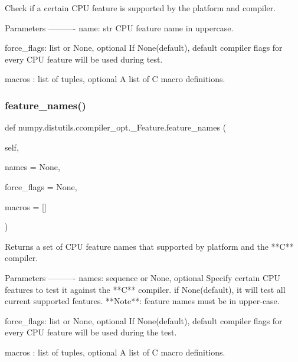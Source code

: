 \begin{DoxyVerb}Check if a certain CPU feature is supported by the platform and compiler.

Parameters
----------
name: str
    CPU feature name in uppercase.

force_flags: list or None, optional
    If None(default), default compiler flags for every CPU feature will
    be used during test.

macros : list of tuples, optional
    A list of C macro definitions.
\end{DoxyVerb}
 \mbox{\label{classnumpy_1_1distutils_1_1ccompiler__opt_1_1__Feature_afd8af969d9b3cc3872efe625903a55bd}} 
\subsubsection{\texorpdfstring{feature\+\_\+names()}{feature\_names()}}
{\footnotesize\ttfamily def numpy.\+distutils.\+ccompiler\+\_\+opt.\+\_\+\+Feature.\+feature\+\_\+names (\begin{DoxyParamCaption}\item[{}]{self,  }\item[{}]{names = {\ttfamily None},  }\item[{}]{force\+\_\+flags = {\ttfamily None},  }\item[{}]{macros = {\ttfamily \mbox{[}\mbox{]}} }\end{DoxyParamCaption})}

\begin{DoxyVerb}Returns a set of CPU feature names that supported by platform and the **C** compiler.

Parameters
----------
names: sequence or None, optional
    Specify certain CPU features to test it against the **C** compiler.
    if None(default), it will test all current supported features.
    **Note**: feature names must be in upper-case.

force_flags: list or None, optional
    If None(default), default compiler flags for every CPU feature will
    be used during the test.

macros : list of tuples, optional
    A list of C macro definitions.
\end{DoxyVerb}
 \mbox{\label{classnumpy_1_1distutils_1_1ccompiler__opt_1_1__Feature_a2d778f9b3993c56b7d4fe363626d05b3}} 
